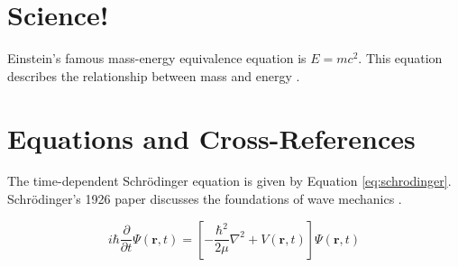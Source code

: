 \documentclass[a4paper,12pt]{article}
\begin{document}
	\section{Science!}
	
	Einstein's famous mass-energy equivalence equation is
	\(E = mc^2\). This equation describes the relationship between
	mass and energy \citep{einstein1905}.
	
	\section{Equations and Cross-References}
	
	The time-dependent Schrödinger equation is given by
	Equation \ref{eq:schrodinger}. Schrödinger's 1926 paper
	discusses the foundations of wave mechanics
	\citep{schrodinger1926}.
	
	\begin{equation}
		i\hbar\frac{\partial}{\partial t}\Psi(\mathbf{r},t)
		=
		\left[
		-\frac{\hbar^2}{2\mu}\nabla^2
		+ V(\mathbf{r},t)
		\right]\Psi(\mathbf{r},t)
		\label{eq:schrodinger}
	\end{equation}
	
	
	
	
\end{document}
